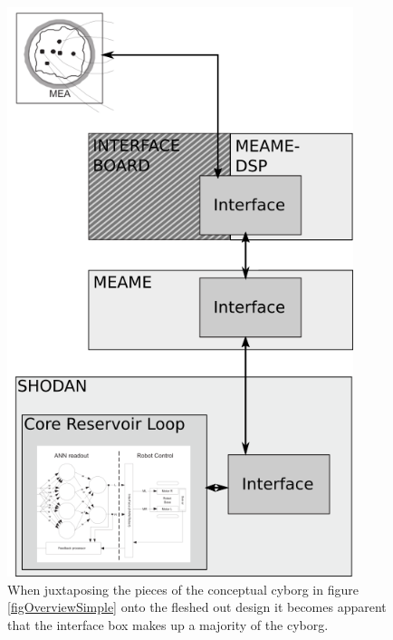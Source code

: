 \begin{figure}[h]
  \centering
  \includegraphics[width=0.9\textwidth]{fig/ConceptMap.png}
  \caption{
    When juxtaposing the pieces of the conceptual cyborg in figure
    \ref{figOverviewSimple} onto the fleshed out design it becomes apparent that the
    interface box makes up a majority of the cyborg.
  }
  \label{figJuxta}
\end{figure}
